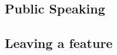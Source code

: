 \documentclass{scrartcl}
\begin{document}





\subsection{Public Speaking}








\par






\subsection{Leaving a feature} \label{Leaving}








\end{document}
